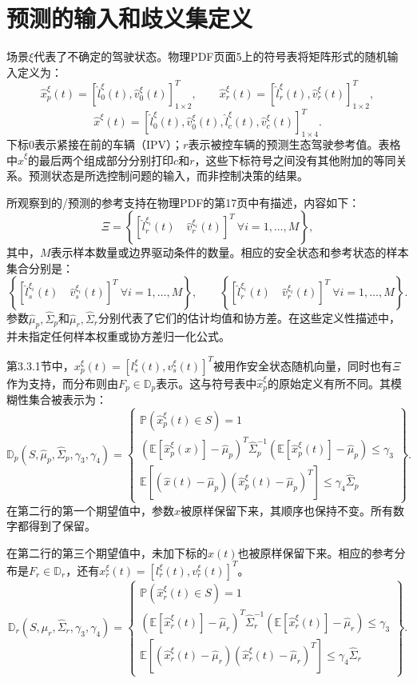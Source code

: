 \documentclass[10pt]{article}
\begin{document}
\section*{预测的输入和歧义集定义}
场景\(\xi\)代表了不确定的驾驶状态。物理PDF页面5上的符号表将矩阵形式的随机输入定义为：
\[
\hat x_p^\xi(t)=[\hat l_0^\xi(t),\hat v_0^\xi(t)]_{1\times2}^T,\qquad
\hat x_r^\xi(t)=[\hat l_r^\xi(t),\hat v_r^\xi(t)]_{1\times2}^T,
\]
\[
\hat x^\xi(t)=[\hat l_0^\xi(t),\hat v_0^\xi(t),\hat l_c^\xi(t),\hat v_c^\xi(t)]_{1\times4}^T.
\]
下标\(0\)表示紧接在前的车辆（IPV）；\(r\)表示被控车辆的预测生态驾驶参考值。表格中\(\hat x^\xi\)的最后两个组成部分分别打印\(c\)和\(r\)，这些下标符号之间没有其他附加的等同关系。预测状态是所选控制问题的输入，而非控制决策的结果。

所观察到的/预测的参考支持在物理PDF的第17页中有描述，内容如下：
\[
\Xi=\left\{[\hat l_r^{\xi_i}(t)\quad\hat v_r^{\xi_i}(t)]^T\ \forall i=1,\ldots,M\right\},
\]
其中，\(M\)表示样本数量或边界驱动条件的数量。相应的安全状态和参考状态的样本集合分别是：
\[
\left\{[\hat l_s^{\xi_i}(t)\quad\hat v_s^{\xi_i}(t)]^T\ \forall i=1,\ldots,M\right\},\qquad
\left\{[\hat l_r^{\xi_i}(t)\quad\hat v_r^{\xi_i}(t)]^T\ \forall i=1,\ldots,M\right\}.
\]
参数\(\hat\mu_p,\hat\Sigma_p\)和\(\hat\mu_r,\hat\Sigma_r\)分别代表了它们的估计均值和协方差。在这些定义性描述中，并未指定任何样本权重或协方差归一化公式。

第3.3.1节中，\(x_p^\xi(t)=[l_s^\xi(t),v_s^\xi(t)]^T\)被用作安全状态随机向量，同时也有\(\Xi\)作为支持，而分布则由\(F_p\in\mathbb D_p\)表示。这与符号表中\(\hat x_p^\xi\)的原始定义有所不同。其模糊性集合被表示为：
\begin{equation}
\mathbb D_p(S,\hat\mu_p,\hat\Sigma_p,\gamma_3,\gamma_4)=
\left\{\begin{array}{l}
\mathbb P(\hat x_p^\xi(t)\in S)=1\\
(\mathbb E[\hat x_p^\xi(x)]-\hat\mu_p)^T\hat\Sigma_p^{-1}
(\mathbb E[\hat x_p^\xi(t)]-\hat\mu_p)\leq\gamma_3\\
\mathbb E[(\hat x(t)-\hat\mu_p)(\hat x_p^\xi(t)-\hat\mu_p)^T]\leq\gamma_4\hat\Sigma_p
\end{array}\right\}.
\tag{21}
\end{equation}
在第二行的第一个期望值中，参数\(x\)被原样保留下来，其顺序也保持不变。所有数字都得到了保留。

在第二行的第三个期望值中，未加下标的\(\hat x(t)\)也被原样保留下来。相应的参考分布是\(F_r\in\mathbb D_r\)，还有\(x_r^\xi(t)=[l_r^\xi(t),v_r^\xi(t)]^T\)。
\begin{equation}
\mathbb D_r(S,\hat\mu_r,\hat\Sigma_r,\gamma_3,\gamma_4)=
\left\{\begin{array}{l}
\mathbb P(\hat x_r^\xi(t)\in S)=1\\
(\mathbb E[\hat x_r^\xi(t)]-\hat\mu_r)^T\hat\Sigma_r^{-1}
(\mathbb E[\hat x_r^\xi(t)]-\hat\mu_r)\leq\gamma_3\\
\mathbb E[(\hat x_r^\xi(t)-\hat\mu_r)(\hat x_r^\xi(t)-\hat\mu_r)^T]\leq\gamma_4\hat\Sigma_r
\end{array}\right\}.
\tag{22}
\end{equation}
\end{document}
